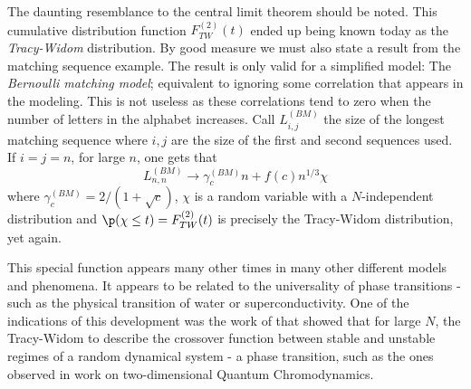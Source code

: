 The daunting resemblance to the central limit theorem should be noted. This cumulative distribution function $F_{TW}^{(2)}(t)$ ended up being known today as the \textit{Tracy-Widom} distribution. By good measure we must also state a result from the matching sequence example. The result is only valid for a simplified model: The \textit{Bernoulli matching model}; equivalent to ignoring some correlation that appears in the modeling. This is not useless as these correlations tend to zero when the number of letters in the alphabet increases. Call $L^{(BM)}_{i,j}$ the size of the longest matching sequence where $i,j$ are the size of the first and second sequences used. If $i=j=n$, for large $n$, one gets that
\begin{equation}
	L^{(BM)}_{n,n} \rightarrow \gamma^{(BM)}_c n + f(c) n^{1/3} \chi	
\end{equation}
where $\gamma_c^{(BM)} = 2/(1+\sqrt{c})$, $\chi$ is a random variable with a $N$-independent distribution and $\p(\chi \leq t) = F_{TW}^{(2)}(t)$ is precisely the Tracy-Widom distribution, yet again.

This special function appears many other times in many other different models and phenomena. It appears to be related to the universality of phase transitions - such as the physical transition of water or superconductivity. One of the indications of this development was the work of  that showed that for large $N$, the Tracy-Widom to describe the crossover function between stable and unstable regimes of a random dynamical system - a phase transition, such as the ones observed in  work on two-dimensional Quantum Chromodynamics. %

